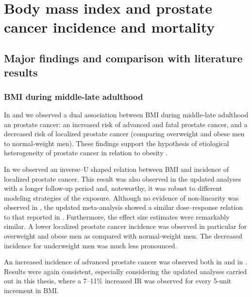 %

\section{Body mass index and prostate cancer incidence and mortality}

\subsection{Major findings and comparison with literature results}

\subsubsection{BMI during middle-late adulthood}

In  and  we observed a dual association between BMI during middle-late adulthood an prostate cancer: an increased risk of advanced and fatal prostate cancer, and a decreased risk of localized prostate cancer (comparing overweight and obese men to normal-weight men). These findings support the hypothesis of etiological heterogeneity of prostate cancer in relation to obesity \citep{discacciati_lifestyle_2014}.

In  we observed an inverse--U shaped relation between BMI and incidence of localized prostate cancer. This result was also observed in the updated analyses with a longer follow-up period and, noteworthy, it was robust to different modeling strategies of the exposure. Although no evidence of non-linearity was observed in , the updated meta-analysis showed a similar dose--response relation to that reported in . Furthermore, the effect size estimates were remarkably similar. A lower localized prostate cancer incidence was observed in particular for overweight and obese men as compared with normal-weight men. The decreased incidence for underweight men was much less pronounced.

An increased incidence of advanced prostate cancer was observed both in  and in . Results were again consistent, especially considering the updated analyses carried out in this thesis, where a 7--11\% increased IR was observed for every 5-unit increment in BMI. 

